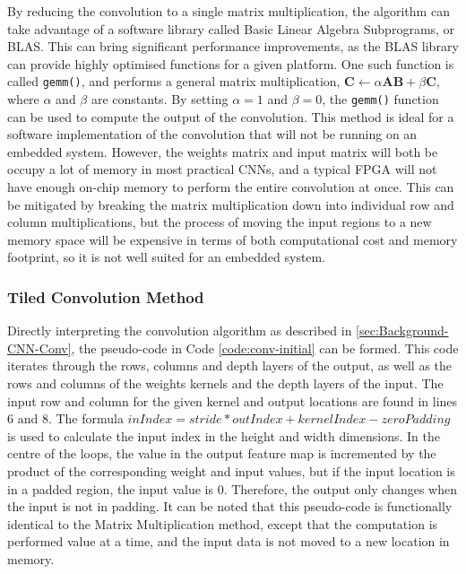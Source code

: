 \documentclass[12pt]{article}
\begin{document}
By reducing the convolution to a single matrix multiplication, the algorithm can take advantage of a software library called Basic Linear Algebra Subprograms, or BLAS. This can bring significant performance improvements, as the BLAS library can provide highly optimised functions for a given platform. One such function is called \lstinline|gemm()|, and performs a general matrix multiplication, $\mathbf{C} \gets \alpha\mathbf{A}\mathbf{B} + \beta\mathbf{C}$, where $\alpha$ and $\beta$ are constants. By setting $\alpha = 1$ and $\beta = 0$, the \lstinline|gemm()| function can be used to compute the output of the convolution. This method is ideal for a software implementation of the convolution that will not be running on an embedded system. However, the weights matrix and input matrix will both be occupy a lot of memory in most practical CNNs, and a typical FPGA will not have enough on-chip memory to perform the entire convolution at once. This can be mitigated by breaking the matrix multiplication down into individual row and column multiplications, but the process of moving the input regions to a new memory space will be expensive in terms of both computational cost and memory footprint, so it is not well suited for an embedded system.

\subsubsection{Tiled Convolution Method}
\label{sec:Design-Conv-TC}

Directly interpreting the convolution algorithm as described in \ref{sec:Background-CNN-Conv}, the pseudo-code in Code \ref{code:conv-initial} can be formed. This code iterates through the rows, columns and depth layers of the output, as well as the rows and columns of the weights kernels and the depth layers of the input. The input row and column for the given kernel and output locations are found in lines 6 and 8. The formula $inIndex = stride * outIndex + kernelIndex - zeroPadding$ is used to calculate the input index in the height and width dimensions. In the centre of the loops, the value in the output feature map is incremented by the product of the corresponding weight and input values, but if the input location is in a padded region, the input value is 0. Therefore, the output only changes when the input is not in padding. It can be noted that this pseudo-code is functionally identical to the Matrix Multiplication method, except that the computation is performed value at a time, and the input data is not moved to a new location in memory.
\end{document}
